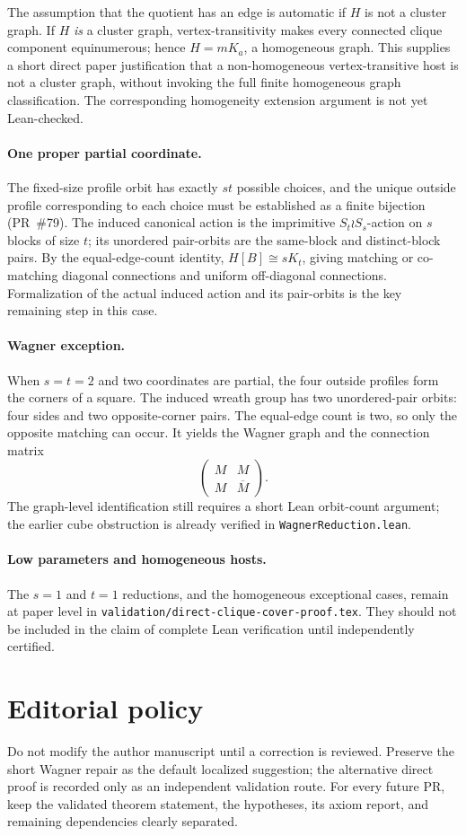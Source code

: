 \documentclass[11pt,a4paper]{article}
\begin{document}
The assumption that the quotient has an edge is automatic if
\(H\) is not a cluster graph. If \(H\) \emph{is} a cluster graph,
vertex-transitivity makes every connected clique component
equinumerous; hence \(H=mK_a\), a homogeneous graph.
This supplies a short direct paper justification that a
non-homogeneous vertex-transitive host is not a cluster graph,
without invoking the full finite homogeneous graph classification.
The corresponding homogeneity extension argument is not yet Lean-checked.

\paragraph{One proper partial coordinate.}
The fixed-size profile orbit has exactly \(st\) possible
choices, and the unique outside profile corresponding to each
choice must be established as a finite bijection (PR~\#79).
The induced canonical action is the imprimitive
\(S_t\wr S_s\)-action on \(s\) blocks of size \(t\);
its unordered pair-orbits are the same-block and
distinct-block pairs. By the equal-edge-count identity,
\(H[B]\cong sK_t\), giving matching or co-matching diagonal
connections and uniform off-diagonal connections.
Formalization of the actual induced action and its pair-orbits
is the key remaining step in this case.

\paragraph{Wagner exception.}
When \(s=t=2\) and two coordinates are partial,
the four outside profiles form the corners of a square.
The induced wreath group has two unordered-pair orbits:
four sides and two opposite-corner pairs.
The equal-edge count is two, so only the opposite
matching can occur. It yields the Wagner graph and the
connection matrix
\[
  \begin{pmatrix} M&M\\ M&\overline M\end{pmatrix}.
\]
The graph-level identification still requires a short Lean
orbit-count argument; the earlier cube obstruction is
already verified in \texttt{WagnerReduction.lean}.

\paragraph{Low parameters and homogeneous hosts.}
The \(s=1\) and \(t=1\) reductions, and the homogeneous
exceptional cases, remain at paper level in
\texttt{validation/direct-clique-cover-proof.tex}.
They should not be included in the claim of complete
Lean verification until independently certified.

\section*{Editorial policy}
Do not modify the author manuscript until a correction is
reviewed. Preserve the short Wagner repair as the default
localized suggestion; the alternative direct proof is
recorded only as an independent validation route.
For every future PR, keep the validated theorem statement,
the hypotheses, its axiom report, and remaining dependencies
clearly separated.
\end{document}
